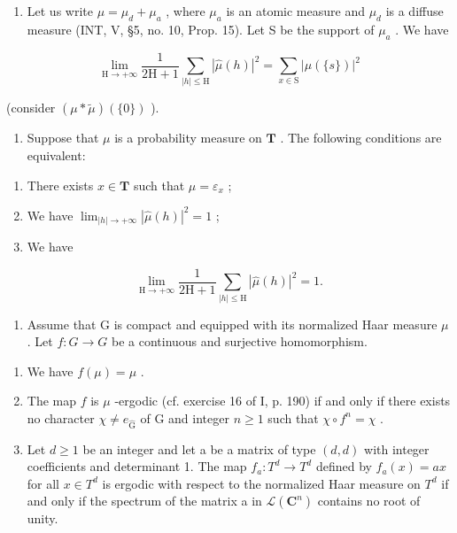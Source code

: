 \begin{enumerate}
\def\labelenumi{\alph{enumi})}
\setcounter{enumi}{1}
\tightlist
\item
  Let us write \(\mu = \mu_d + \mu_a\) , where \(\mu_a\) is an atomic measure and \(\mu_d\) is a diffuse measure (INT, V, §5, no. 10, Prop. 15). Let S be the support of \(\mu_a\) . We have
\end{enumerate}

\[
\lim _ {\mathrm{H} \to + \infty} \frac {1}{2 \mathrm{H} + 1} \sum_ {| h | \leqslant \mathrm{H}} | \widehat {\mu} (h) | ^ {2} = \sum_ {x \in \mathrm{S}} | \mu (\{s \}) | ^ {2}
\]

(consider \((\mu * \widetilde{\mu})(\{0\})\) ).

\begin{enumerate}
\def\labelenumi{\alph{enumi})}
\setcounter{enumi}{2}
\tightlist
\item
  Suppose that \(\mu\) is a probability measure on \(\mathbf{T}\) . The following conditions are equivalent:
\end{enumerate}

\begin{enumerate}
\def\labelenumi{(\roman{enumi})}
\item
  There exists \(x \in \mathbf{T}\) such that \(\mu = \varepsilon_x\) ;
\item
  We have \(\lim_{|h|\to+\infty}|\widehat{\mu}(h)|^{2}=1\) ;
\item
  We have
\end{enumerate}

\[
\lim _ {\mathrm{H} \rightarrow + \infty} \frac {1}{2 \mathrm{H} + 1} \sum_ {| h | \leqslant \mathrm{H}} | \widehat {\mu} (h) | ^ {2} = 1.
\]

\begin{enumerate}
\def\labelenumi{\arabic{enumi})}
\setcounter{enumi}{64}
\tightlist
\item
  Assume that G is compact and equipped with its normalized Haar measure \(\mu\) . Let \(f: G \to G\) be a continuous and surjective homomorphism.
\end{enumerate}

\begin{enumerate}
\def\labelenumi{\alph{enumi})}
\item
  We have \(f(\mu) = \mu\) .
\item
  The map \(f\) is \(\mu\) -ergodic (cf. exercise 16 of I, p. 190) if and only if there exists no character \(\chi \neq e_{\widehat{\mathrm{G}}}\) of G and integer \(n \geqslant 1\) such that \(\chi \circ f^n = \chi\) .
\item
  Let \(d \geqslant 1\) be an integer and let a be a matrix of type \((d, d)\) with integer coefficients and determinant 1. The map \(f_{a} \colon T^{d} \to T^{d}\) defined by \(f_{a}(x) = ax\) for all \(x \in T^{d}\) is ergodic with respect to the normalized Haar measure on \(T^{d}\) if and only if the spectrum of the matrix a in \(\mathcal{L}(\mathbf{C}^{n})\) contains no root of unity.
\end{enumerate}

